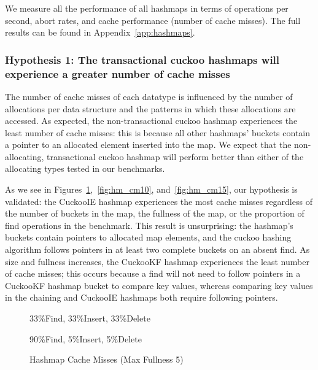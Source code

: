 We measure all the performance of all hashmaps in terms of operations per second, abort rates, and cache performance (number of cache misses). 
The full results can be found in Appendix~\ref{app:hashmaps}.

\subsubsection{Hypothesis 1: The transactional cuckoo hashmaps will experience a greater number of cache misses}

The number of cache misses of each datatype is influenced by the number of allocations per data structure and the patterns in which these allocations are accessed. As expected, the non-transactional cuckoo hashmap experiences the least number of cache misses: this is because all other hashmaps' buckets contain a pointer to an allocated element inserted into the map. We expect that the non-allocating, transactional cuckoo hashmap will perform better than either of the allocating types tested in our benchmarks.

As we see in Figures~\ref{fig:hm_cm5},~\ref{fig:hm_cm10}, and~\ref{fig:hm_cm15}, our hypothesis is validated: the CuckooIE hashmap experiences the most cache misses regardless of the number of buckets in the map, the fullness of the map, or the proportion of find operations in the benchmark. This result is unsurprising: the hashmap's buckets contain pointers to allocated map elements, and the cuckoo hashing algorithm follows pointers in at least two complete buckets on an absent find. As size and fullness increases, the CuckooKF hashmap experiences the least number of cache misses; this occurs because a find will not need to follow pointers in a CuckooKF hashmap bucket to compare key values, whereas comparing key values in the chaining and CuckooIE hashmaps both require following pointers.

    \begin{figure}[H]
    \centering
        \begin{minipage}{0.75\textwidth}
        \centering
            \caption*{33\%Find, 33\%Insert, 33\%Delete}
            \vspace{12pt}
        \end{minipage}
        \begin{minipage}{0.75\textwidth}
            \centering
            \caption*{90\%Find, 5\%Insert, 5\%Delete}
        \end{minipage}
        \caption{Hashmap Cache Misses (Max Fullness 5)}
		\label{fig:hm_cm5}
    \end{figure}

